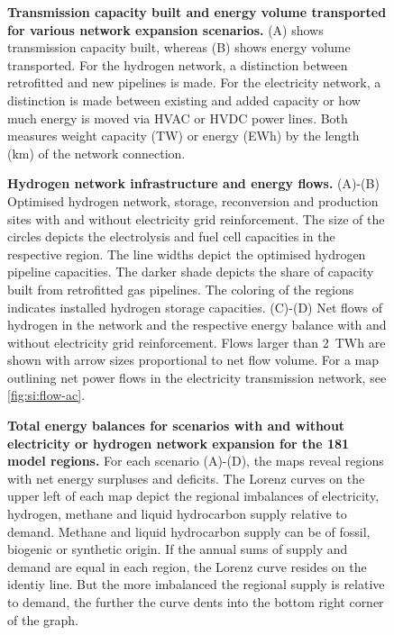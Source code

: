 
\begin{figure}
    \caption{\textbf{Transmission capacity built and energy volume transported
        for various network expansion scenarios.} (A) shows transmission
        capacity built, whereas (B) shows energy volume transported. For the hydrogen
        network, a distinction between retrofitted and new pipelines is made.
        For the electricity network, a distinction is made between existing and
        added capacity or how much energy is moved via HVAC or HVDC power lines.
        Both measures weight capacity (TW) or energy (EWh) by the length (km) of
        the network connection.}
    \label{fig:network-stats}
\end{figure}



\begin{figure}
    \caption{ \textbf{Hydrogen network infrastructure and energy flows.}
    (A)-(B) Optimised hydrogen network, storage, reconversion and production
    sites with and without electricity grid reinforcement. The size of the
    circles depicts the electrolysis and fuel cell capacities in the respective
    region. The line widths depict the optimised hydrogen pipeline capacities.
    The darker shade depicts the share of capacity built from retrofitted gas
    pipelines. The coloring of the regions indicates installed hydrogen storage
    capacities.
    (C)-(D) Net flows of hydrogen in the network and the respective energy
    balance  with and without electricity grid reinforcement. Flows larger than
    2~TWh are shown with arrow sizes proportional to net flow volume.
    For a map outlining net power flows in the electricity transmission network,
    see \cref{fig:si:flow-ac}. }
    \label{fig:h2-network}
\end{figure}



\begin{figure}
    \caption{ \textbf{Total energy balances for scenarios with and without
    electricity or hydrogen network expansion for the 181 model regions.} For
    each scenario (A)-(D), the maps reveal regions with net energy surpluses and
    deficits. The Lorenz curves on the upper left of each map depict the
    regional imbalances of electricity, hydrogen, methane and liquid hydrocarbon
    supply relative to demand. Methane and liquid hydrocarbon supply can be of
    fossil, biogenic or synthetic origin. If the annual sums of supply and
    demand are equal in each region, the Lorenz curve resides on the identiy
    line. But the more imbalanced the regional supply is relative to demand, the
    further the curve dents into the bottom right corner of the graph.}
    \label{fig:io}
\end{figure}
